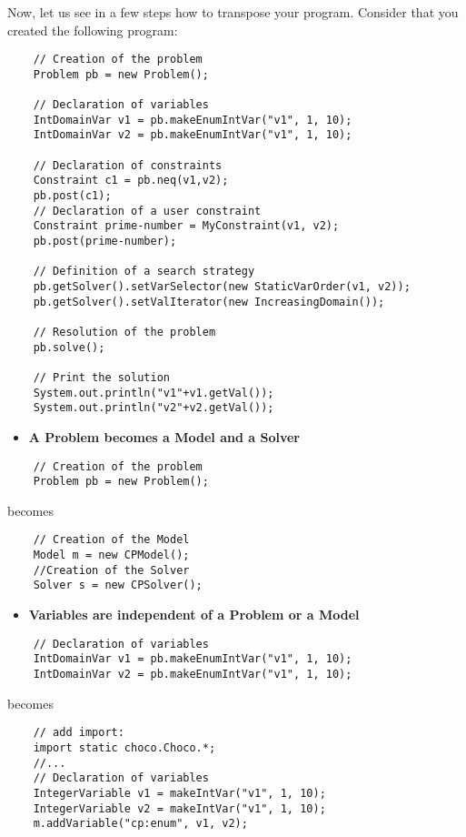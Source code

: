 Now, let us see in a few steps how to transpose your program. Consider that you created the following program:
\begin{lstlisting}
	// Creation of the problem
	Problem pb = new Problem();
	
	// Declaration of variables
	IntDomainVar v1 = pb.makeEnumIntVar("v1", 1, 10);
	IntDomainVar v2 = pb.makeEnumIntVar("v1", 1, 10);
	
	// Declaration of constraints
	Constraint c1 = pb.neq(v1,v2);
	pb.post(c1);
	// Declaration of a user constraint
	Constraint prime-number = MyConstraint(v1, v2);
	pb.post(prime-number);
	
	// Definition of a search strategy
	pb.getSolver().setVarSelector(new StaticVarOrder(v1, v2));
	pb.getSolver().setValIterator(new IncreasingDomain());
	
	// Resolution of the problem
	pb.solve();
	
	// Print the solution
	System.out.println("v1"+v1.getVal());
	System.out.println("v2"+v2.getVal());
\end{lstlisting}

\begin{itemize}
	\item \textbf{A Problem becomes a Model and a Solver}
\end{itemize}

\begin{lstlisting}
	// Creation of the problem
	Problem pb = new Problem();
\end{lstlisting}
becomes
\begin{lstlisting}
	// Creation of the Model
	Model m = new CPModel();
	//Creation of the Solver
	Solver s = new CPSolver();
\end{lstlisting}

\begin{itemize}
	\item \textbf{Variables are independent of a Problem or a Model}
\end{itemize}

\begin{lstlisting}
	// Declaration of variables
	IntDomainVar v1 = pb.makeEnumIntVar("v1", 1, 10);
	IntDomainVar v2 = pb.makeEnumIntVar("v1", 1, 10);
\end{lstlisting}
becomes
\begin{lstlisting}
	// add import:
	import static choco.Choco.*;
	//...
	// Declaration of variables
	IntegerVariable v1 = makeIntVar("v1", 1, 10);
	IntegerVariable v2 = makeIntVar("v1", 1, 10);
	m.addVariable("cp:enum", v1, v2);
\end{lstlisting}

